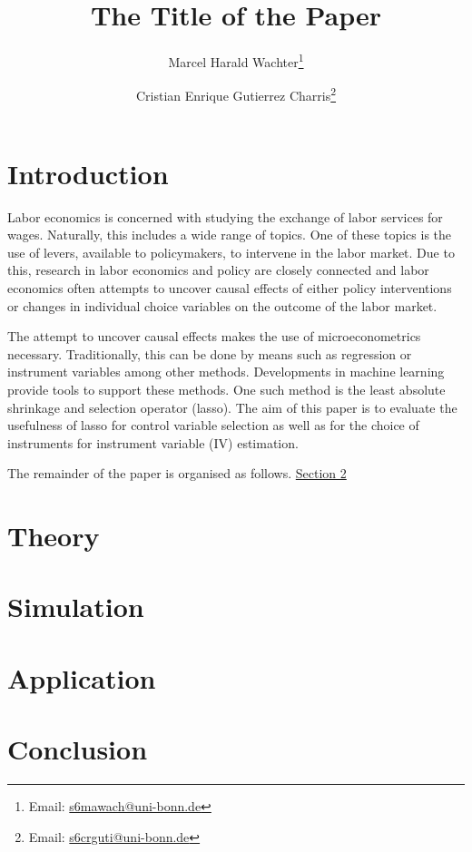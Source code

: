 \documentclass[a4paper,12pt]{article}
\author{Marcel Harald Wachter\thanks{Email: \href{mailto:s6mawach@uni-bonn.de}{s6mawach@uni-bonn.de}} \and Cristian Enrique Gutierrez Charris\thanks{Email: \href{mailto:s6crguti@uni-bonn.de}{s6crguti@uni-bonn.de}}}
\title{The Title of the Paper}
\begin{document}
\maketitle
\thispagestyle{empty}

\begin{singlespace}
\begin{abstract}

\end{abstract}
\end{singlespace}

\newpage
{}

\section{Introduction}
\label{sec:introduction}
Labor economics is concerned with studying the exchange of labor services for wages.
Naturally, this includes a wide range of topics.
One of these topics is the use of levers, available to policymakers, to intervene in the labor market.
Due to this, research in labor economics and policy are closely connected and labor economics often attempts to uncover causal effects of either policy interventions or changes in individual choice variables on the outcome of the labor market.

The attempt to uncover causal effects makes the use of microeconometrics necessary. Traditionally, this can be done by means such as regression or instrument variables among other methods. Developments in machine learning provide tools to support these methods. One such method is the least absolute shrinkage and selection operator (lasso). The aim of this paper is to evaluate the usefulness of lasso for control variable selection as well as for the choice of instruments for instrument variable (IV) estimation.

The remainder of the paper is organised as follows. \hyperref[sec:theory]{Section 2}


\section{Theory}
\label{sec:theory}

\section{Simulation}
\label{sec:simulation}

\section{Application}
\label{sec:application}

\section{Conclusion}
\label{sec:conclusion}
\end{document}
